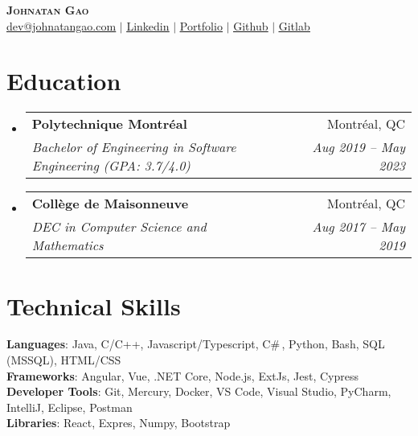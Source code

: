 \documentclass[letterpaper,11pt]{article}
\makeatletter
\newcommand{\resumeSubheading}[4]{
  \vspace{-2pt}\item
    \begin{tabular*}{0.97\textwidth}[t]{l@{\extracolsep{\fill}}r}
      \textbf{#1} & #2 \\
      \textit{\small#3} & \textit{\small #4} \\
    \end{tabular*}\vspace{-7pt}
}
\newcommand{\resumeSubHeadingListStart}{\begin{itemize}[leftmargin=0.15in, label={}]}
\newcommand{\resumeSubHeadingListEnd}{\end{itemize}}
\makeatother
\begin{document}

\begin{center}
    \textbf{\Huge \scshape Johnatan Gao} \\ \vspace{1pt}
    \href{mailto:x@x.com}{\underline{dev@johnatangao.com}} $|$ 
    \href{https://linkedin.com/in/johnatan}{\underline{Linkedin}} $|$
    \href{https://johnatangao.com}{\underline{Portfolio}} $|$
    \href{https://github.com/TechBonanza}{\underline{Github}} $|$
    \href{https://gitlab.com/TechBonanza}{\underline{Gitlab}}
\end{center}


\section{Education}
  \resumeSubHeadingListStart
    \resumeSubheading
      {Polytechnique Montréal}{Montréal, QC}
      {Bachelor of Engineering in Software Engineering (GPA: 3.7/4.0)}{Aug 2019 -- May 2023}
    \resumeSubheading
      {Collège de Maisonneuve}{Montréal, QC}
      {DEC in Computer Science and Mathematics}{Aug 2017 -- May 2019}
  \resumeSubHeadingListEnd

\section{Technical Skills}
 \begin{itemize}[leftmargin=0.15in, label={}]
    \small{\item{
     \textbf{Languages}{: Java, C/C++, Javascript/Typescript, C\#\,, Python, Bash, SQL (MSSQL), HTML/CSS} \\
     \textbf{Frameworks}{: Angular, Vue, .NET Core, Node.js, ExtJs, Jest, Cypress} \\
     \textbf{Developer Tools}{: Git, Mercury, Docker, VS Code, Visual Studio, PyCharm, IntelliJ, Eclipse, Postman} \\
     \textbf{Libraries}{: React, Expres, Numpy, Bootstrap}
    }}
 \end{itemize}
\end{document}
